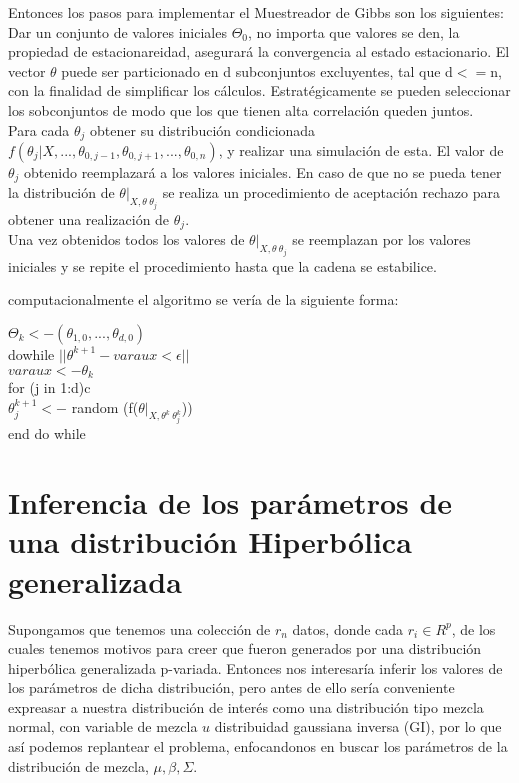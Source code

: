 \documentclass[11pt]{book}
\begin{document}
Entonces los pasos para implementar el Muestreador de Gibbs son los siguientes:\\

Dar un conjunto de valores iniciales $\Theta_{0}$, no importa que valores se den, la propiedad de estacionareidad, asegurará la convergencia al estado estacionario. El vector $\theta$ puede ser particionado en d subconjuntos excluyentes, tal que d$<=$n, con la finalidad de simplificar los cálculos. Estratégicamente se pueden seleccionar los sobconjuntos de modo que los que tienen alta correlación queden juntos.\\

Para cada $\theta_{j}$ obtener su distribución condicionada  $f(\theta_{j} |X,...,\theta_{0,j-1},\theta_{0,j+1},...,\theta_{0,n})$, y realizar una simulación de esta. El valor de $\theta_{j}$ obtenido reemplazará a los valores iniciales. En caso de que no se pueda tener la distribución de $\theta|_{X,\theta \ \theta_{j}}$ se realiza un procedimiento de aceptación rechazo para obtener una realización de $\theta_{j}$.\\

Una vez obtenidos todos los valores de $\theta|_{X,\theta \ \theta_{j}}$ se reemplazan por los valores iniciales y se repite el procedimiento hasta que la cadena se estabilice.

computacionalmente el algoritmo se vería de la siguiente forma:\\
\begin{center}
	$\Theta_{k} <- (\theta_{1,0},...,\theta_{d,0})$\\
	do{while $||\theta^{k+1}-varaux< \epsilon || $ }\\
		$varaux<-\theta_{k}	$\\
		for (j in 1:d)c\\
			$\theta_{j} ^{k+1}<-$ random (f($\theta|_{X,\theta^{k} \ \theta_{j} ^{k}}$))\\
		              
	end do while\\
\end{center}
									

\section*{Inferencia de los parámetros de una distribución Hiperbólica generalizada}

Supongamos que tenemos una colección de $r_{n}$ datos, donde cada $r_{i}\in R^{p}$, de los cuales tenemos motivos para creer que fueron generados por una distribución hiperbólica generalizada p-variada. Entonces nos interesaría inferir los valores de los parámetros de dicha distribución, pero antes de ello sería conveniente expreasar a nuestra distribución de interés como una distribución tipo mezcla normal, con variable de mezcla $u$ distribuidad gaussiana inversa (GI), por lo que así podemos replantear el problema, enfocandonos en buscar los parámetros de la distribución de mezcla, $\mu,\beta,\Sigma$.\\
\end{document}
